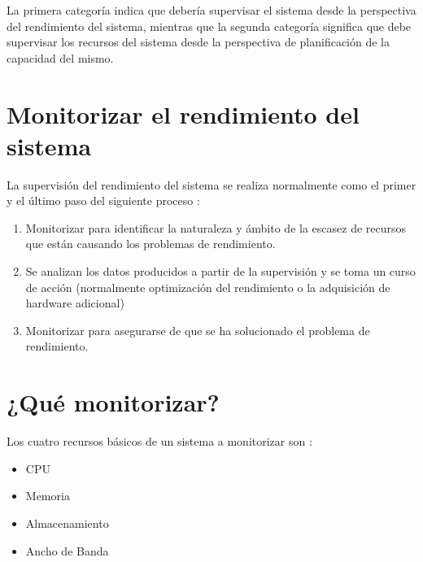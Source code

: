 \documentclass[12pt]{article}
\begin{document}
La primera categoría indica que debería supervisar el sistema desde la 
perspectiva del rendimiento del sistema, mientras que la segunda categoría 
significa que debe supervisar los recursos del sistema desde la perspectiva
de planificación de la capacidad del mismo.

\section*{Monitorizar el rendimiento del sistema}

La supervisión del rendimiento del sistema se realiza normalmente como el 
primer y el último paso del siguiente proceso :

\begin{enumerate}
\item Monitorizar para identificar la naturaleza y ámbito de la escasez de 
recursos que están causando los problemas de rendimiento. 
\item Se analizan los datos producidos a partir de la supervisión y se toma
un curso de acción (normalmente optimización del rendimiento o la 
adquisición de hardware adicional)
\item Monitorizar para asegurarse de que se ha solucionado el problema de 
rendimiento. 
\end{enumerate}

 	


\section*{¿Qué monitorizar?}

Los cuatro recursos básicos de un sistema a monitorizar son :

\begin{itemize}
\item CPU
\item Memoria
\item Almacenamiento
\item Ancho de Banda
\end{itemize}
\end{document}

